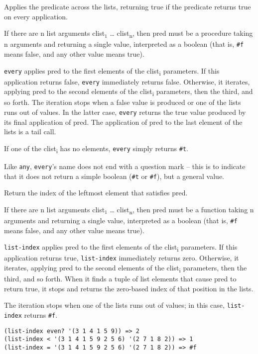 \begin{entry}{%
  }

  Applies the predicate across the lists,
  returning true if the predicate returns true on every application.

  If there are n list arguments clist$_1$ \ldots{}
  clist\textsubscript{n}, then pred must be a procedure taking n
  arguments and returning a single value, interpreted as a boolean
  (that is, \texttt{\#f} means false, and any other value means true).

  \texttt{every} applies pred to the first elements of the
  clist\textsubscript{i} parameters. If this application returns
  false, \texttt{every} immediately returns false. Otherwise, it
  iterates, applying pred to the second elements of the
  clist\textsubscript{i} parameters, then the third, and so forth. The
  iteration stops when a false value is produced or one of the lists
  runs out of values. In the latter case, \texttt{every} returns the
  true value produced by its final application of pred. The
  application of pred to the last element of the lists is a tail call.

  If one of the clist\textsubscript{i} has no elements, \texttt{every}
  simply returns \texttt{\#t}.

  Like \texttt{any}, \texttt{every}'s name does not end with a
  question mark -- this is to indicate that it does not return a
  simple boolean (\texttt{\#t} or \texttt{\#f}), but a general value.
\end{entry}

\begin{entry}{%
  }

  Return the index of the leftmost
  element that satisfies pred.

  If there are n list arguments clist$_1$ \ldots{}
  clist\textsubscript{n}, then pred must be a function taking n
  arguments and returning a single value, interpreted as a boolean
  (that is, \texttt{\#f} means false, and any other value means true).

  \texttt{list-index} applies pred to the first elements of the
  clist\textsubscript{i} parameters. If this application returns true,
  \texttt{list-index} immediately returns zero. Otherwise, it
  iterates, applying pred to the second elements of the
  clist\textsubscript{i} parameters, then the third, and so
  forth. When it finds a tuple of list elements that cause pred to
  return true, it stops and returns the zero-based index of that
  position in the lists.

  The iteration stops when one of the lists runs out of values; in
  this case, \texttt{list-index} returns \texttt{\#f}.

\begin{verbatim}
(list-index even? '(3 1 4 1 5 9)) => 2
(list-index < '(3 1 4 1 5 9 2 5 6) '(2 7 1 8 2)) => 1
(list-index = '(3 1 4 1 5 9 2 5 6) '(2 7 1 8 2)) => #f
\end{verbatim}
\end{entry}

